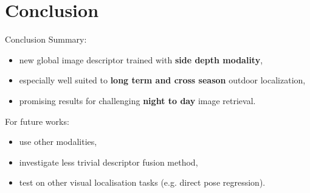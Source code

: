 \section{Conclusion}

\label{sec:conclusion}

\begin{frame}{Conclusion}
	Summary:
	\begin{itemize}
		\item new global image descriptor trained with \textcolor{mLightBrown}{\textbf<1>{side depth modality}},
		\item especially well suited to \textcolor{mLightBrown}{\textbf<1>{long term and cross season}} outdoor localization,
		\item promising results for challenging \textcolor{mLightBrown}{\textbf<1>{night to day}} image retrieval.
	\end{itemize}

	\vfill
	
	{
	For future works:
	\begin{itemize}
		\item use other modalities,
		\item investigate less trivial descriptor fusion method,
		\item test on other visual localisation tasks (e.g. direct pose regression).
	\end{itemize}
	}
\end{frame}
